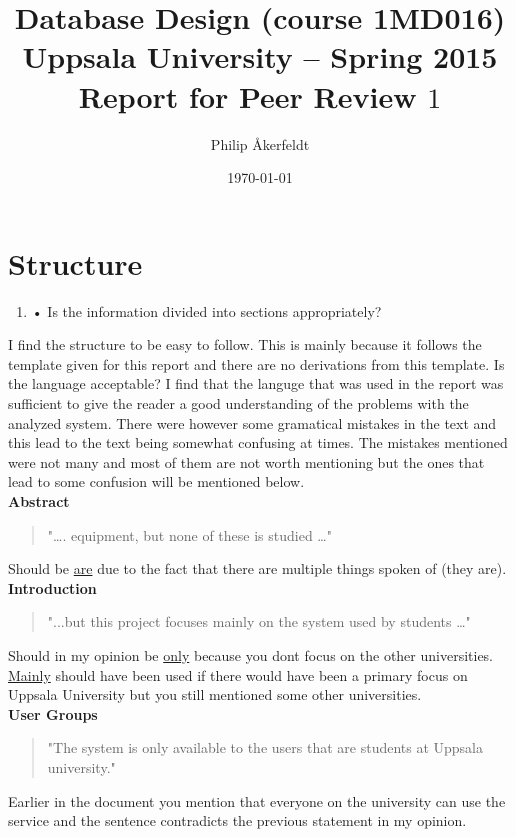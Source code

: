 \documentclass[11pt,a4paper]{article}
\title{\textbf{Database Design (course 1MD016) \\
    Uppsala University -- Spring 2015 \\
    Report for Peer Review $1$  %
    }}              %
\author{Philip Åkerfeldt}  %
\date{\today}
\begin{document}
\maketitle
\newpage
\tableofcontents
\pagebreak


\section{Structure}

\begin {enumerate}
\item[•] Is the information divided into sections appropriately?
\end {enumerate}

I find the structure to be easy to follow. This is mainly because it follows the template given for this report and there are no derivations from this template.
Is the language acceptable? 
I find that the languge that was used in the report was sufficient to give the reader a good understanding of the problems with the analyzed system. There were however some gramatical mistakes in the text and this lead to the text being somewhat confusing at times. The mistakes mentioned were not many and most of them are not worth mentioning but the ones  that lead to some confusion will be mentioned below. \\

\textbf{Abstract}
\begin{quote}
"…. equipment, but none of these is studied …" 
\end{quote}
 Should be \underline{are} due to the fact that there are multiple things spoken of (they are).\\


\textbf{Introduction}
\begin{quote}
"...but this project focuses mainly on the system used by students …"
\end{quote}
Should in my opinion be \underline{only} because you dont focus on the other universities. \underline{Mainly} should have been used if there would have been a primary focus on Uppsala University but you still mentioned some other universities.\\

\textbf{User Groups}
\begin{quote}
"The system is only available to the users that are students at Uppsala university."
\end{quote}
Earlier in the document you mention that everyone on the university can use the service and the sentence contradicts the previous statement in my opinion. \\
\end{document}
